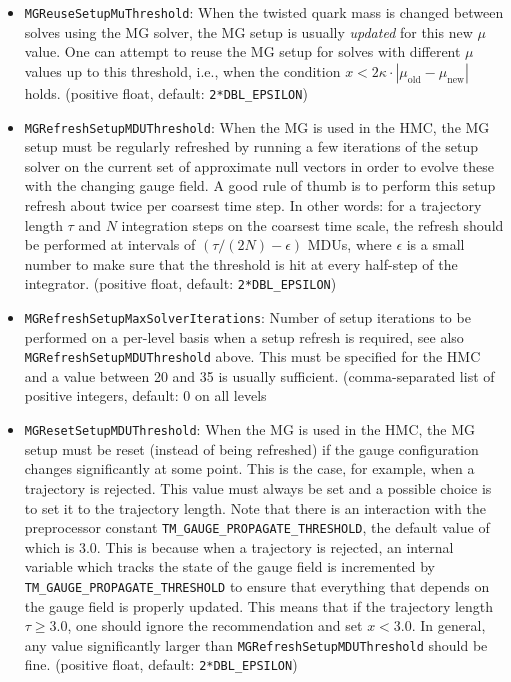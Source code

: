 \begin{itemize}
  \item{ \texttt{MGReuseSetupMuThreshold}: When the twisted quark mass is changed between solves using the MG solver, the MG setup is usually \emph{updated} for this new $\mu$ value. One can attempt to reuse the MG setup for solves with different $\mu$ values up to this threshold, i.e., when the condition $x < 2\kappa\cdot|\mu_\mathrm{old} - \mu_\mathrm{new}|$ holds. (positive float, default: \texttt{2*DBL\_EPSILON})}
  \item{ \texttt{MGRefreshSetupMDUThreshold}: When the MG is used in the HMC, the MG setup must be regularly refreshed by running a few iterations of the setup solver on the current set of approximate null vectors in order to evolve these with the changing gauge field. A good rule of thumb is to perform this setup refresh about twice per coarsest time step. In other words: for a trajectory length $\tau$ and $N$ integration steps on the coarsest time scale, the refresh should be performed at intervals of $(\tau/(2N)-\epsilon)$ MDUs, where $\epsilon$ is a small number to make sure that the threshold is hit at every half-step of the integrator. (positive float, default: \texttt{2*DBL\_EPSILON})}
  \item{ \texttt{MGRefreshSetupMaxSolverIterations}: Number of setup iterations to be performed on a per-level basis when a setup refresh is required, see also \texttt{MGRefreshSetupMDUThreshold} above. This must be specified for the HMC and a value between 20 and 35 is usually sufficient. (comma-separated list of positive integers, default: $0$ on all levels}
  \item{ \texttt{MGResetSetupMDUThreshold}: When the MG is used in the HMC, the MG setup must be reset (instead of being refreshed) if the gauge configuration changes significantly at some point. This is the case, for example, when a trajectory is rejected. This value must always be set and a possible choice is to set it to the trajectory length. Note that there is an interaction with the preprocessor constant \texttt{TM\_GAUGE\_PROPAGATE\_THRESHOLD}, the default value of which is $3.0$. This is because when a trajectory is rejected, an internal variable which tracks the state of the gauge field is incremented by \texttt{TM\_GAUGE\_PROPAGATE\_THRESHOLD} to ensure that everything that depends on the gauge field is properly updated. This means that if the trajectory length $\tau \geq 3.0$, one should ignore the recommendation and set $x < 3.0$. In general, any value significantly larger than \texttt{MGRefreshSetupMDUThreshold} should be fine. (positive float, default: \texttt{2*DBL\_EPSILON}) }

\end{itemize}
